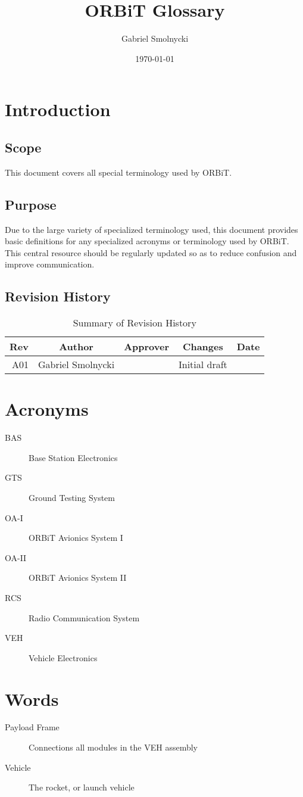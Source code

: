 \documentclass[12pt,article]{memoir}
\title{ORBiT Glossary}
\author{Gabriel Smolnycki}
\date{\today}
\begin{document}
	


\tableofcontents*
\clearpage


\chapter{Introduction}
\section{Scope}
This document covers all special terminology used by ORBiT.

\section{Purpose}
Due to the large variety of specialized terminology used, this document provides basic definitions for any specialized acronyms or terminology used by ORBiT. This central resource should be regularly updated so as to reduce confusion and improve communication.

\section{Revision History}
\begin{table}[H]
	\centering
	\begin{tabu}{r || c | c | c | c }
		Rev & Author & Approver & Changes & Date\\ \hline
		A01 & Gabriel Smolnycki & & Initial draft & \\
	\end{tabu}
	\caption{Summary of Revision History}
	\label{tab:rev}
\end{table}

\newpage

\chapter{Acronyms}

\begin{description}
	\item[BAS] Base Station Electronics
	\item[GTS] Ground Testing System
	\item[OA-I] ORBiT Avionics System I
	\item[OA-II] ORBiT Avionics System II
	\item[RCS] Radio Communication System
	\item[VEH] Vehicle Electronics
\end{description}

\newpage

\chapter{Words}

\begin{description}
	\item[Payload Frame] Connections all modules in the VEH assembly
	\item[Vehicle] The rocket, or launch vehicle
\end{description}

\end{document}
